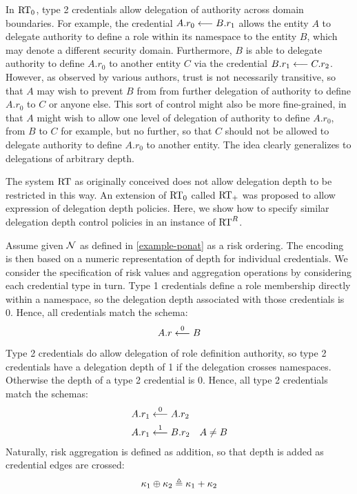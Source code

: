 In $\RT_0$, type 2 credentials allow delegation of authority across
domain boundaries.  For example, the credential
$\cred{A.r_0}{B.r_1}{}$ allows the entity $A$ to delegate authority to
define a role within its namespace to the entity $B$, which may denote
a different security domain.  Furthermore, $B$ is able to delegate
authority to define $A.r_0$ to another entity $C$ via the credential
$\cred{B.r_1}{C.r_2}{}$.  However, as observed by various authors,
trust is not necessarily transitive, so that $A$ may wish to prevent
$B$ from from further delegation of authority to define $A.r_0$ to $C$
or anyone else.  This sort of control might also be more fine-grained,
in that $A$ might wish to allow one level of delegation of authority
to define $A.r_0$, from $B$ to $C$ for example, but no further, so
that $C$ should not be allowed to delegate authority to define $A.r_0$
to another entity.  The idea clearly generalizes to delegations of
arbitrary depth.

The system $\RT$ as originally conceived \cite{Li:2003-04} does not
allow delegation depth to be restricted in this way.  An extension of
$\RT_0$ called $\RT_+$ \cite{hong-zhu-wang-aina05} was proposed to
allow expression of delegation depth policies.  Here, we show how to
specify similar delegation depth control policies in an instance of
$\RTR$.

Assume given $\ponat$ as defined in \autoref{example-ponat} as a risk
ordering.  The encoding is then based on a numeric representation of
depth for individual credentials.  We consider the specification of
risk values and aggregation operations by considering each credential
type in turn.  Type 1 credentials define a role membership directly
within a namespace, so the delegation depth associated with those
credentials is 0.  Hence, all credentials match the schema:
$$
\cred{A.r}{B}{0}
$$

Type 2 credentials do allow delegation of role definition authority,
so type 2 credentials have a delegation depth of 1 if the delegation
crosses namespaces.  Otherwise the depth of a type 2 credential is 
0.  Hence, all type 2 credentials match the schemas:
\begin{eqnarray*}
&\cred{A.r_1}{A.r_2}{0}\\
&\cred{A.r_1}{B.r_2}{1} \quad A \ne B
\end{eqnarray*}
Naturally, risk aggregation is defined as addition, so that depth is
added as credential edges are crossed:
$$
\risk_1 \riskplus \risk_2 \defeq \risk_1 + \risk_2
$$

